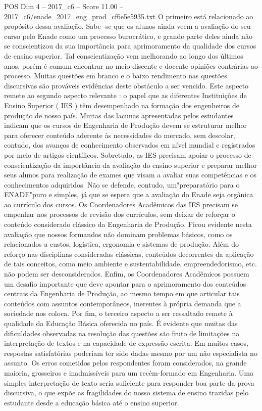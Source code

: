 \begin{textsample}{POS Dim 4 – 2017\_c6 – Score 11.00 – 2017\_c6/enade\_2017\_eng\_prod\_cf6e5e5935.txt}
O primeiro está relacionado ao propósito dessa avaliação.
Sabe -se que os alunos ainda veem a avaliação do seu curso pelo Enade como um processo burocrático, e grande parte deles ainda não se conscientizou da sua importância para aprimoramento da qualidade dos cursos de ensino superior.
Tal conscientização vem melhorando ao longo dos últimos anos, porém é comum encontrar no meio discente e docente opiniões contrárias ao processo.
Muitas questões em branco e o baixo rendimento nas questões discursivas são prováveis evidências deste obstáculo a ser vencido.
Este aspecto remete ao segundo aspecto relevante : o papel que as diferentes Instituições de Ensino Superior ( IES ) têm desempenhado na formação dos engenheiros de produção de nosso país.
Muitas das lacunas apresentadas pelos estudantes indicam que os cursos de Engenharia de Produção devem se estruturar melhor para oferecer conteúdo aderente às necessidades do mercado, sem descolar, contudo, dos avanços de conhecimento observados em nível mundial e registrados por meio de artigos científicos.
Sobretudo, as IES precisam apoiar o processo de conscientização da importância da avaliação do ensino superior e preparar melhor seus alunos para realização de exames que visam a avaliar suas competências e os conhecimentos adquiridos.
Não se defende, contudo, um"preparatório para o ENADE"puro e simples, já que se espera que a avaliação do Enade seja orgânica ao currículo dos cursos.
Os Coordenadores Acadêmicos das IES precisam se empenhar nos processos de revisão dos currículos, sem deixar de reforçar o conteúdo considerado clássico da Engenharia de Produção.
Ficou evidente nesta avaliação que nossos formandos não dominam problemas básicos, como os relacionados a custos, logística, ergonomia e sistemas de produção.
Além do reforço nas disciplinas consideradas clássicas, conteúdos decorrentes da aplicação de tais conceitos, como meio ambiente e sustentabilidade, empreendedorismo, etc. não podem ser desconsiderados.
Enfim, os Coordenadores Acadêmicos possuem um desafio importante que deve apontar para o aprimoramento dos conteúdos centrais da Engenharia de Produção, ao mesmo tempo em que articular tais conteúdos com assuntos contemporâneos, inerentes à própria demanda que a sociedade nos coloca.
Por fim, o terceiro aspecto a ser ressaltado remete à qualidade da Educação Básica oferecida no país.
É evidente que muitas das dificuldades observadas na resolução das questões são fruto de limitações na interpretação de textos e na capacidade de expressão escrita.
Em muitos casos, respostas satisfatórias poderiam ter sido dadas mesmo por um não especialista no assunto.
Os erros cometidos pelos respondentes foram considerados, na grande maioria, grosseiros e inadmissíveis para um recém-formado em Engenharia.
Uma simples interpretação de texto seria suficiente para responder boa parte da prova discursiva, o que expõe as fragilidades do nosso sistema de ensino trazidas pelo estudante desde a educação básica até o ensino superior.

\end{textsample}
